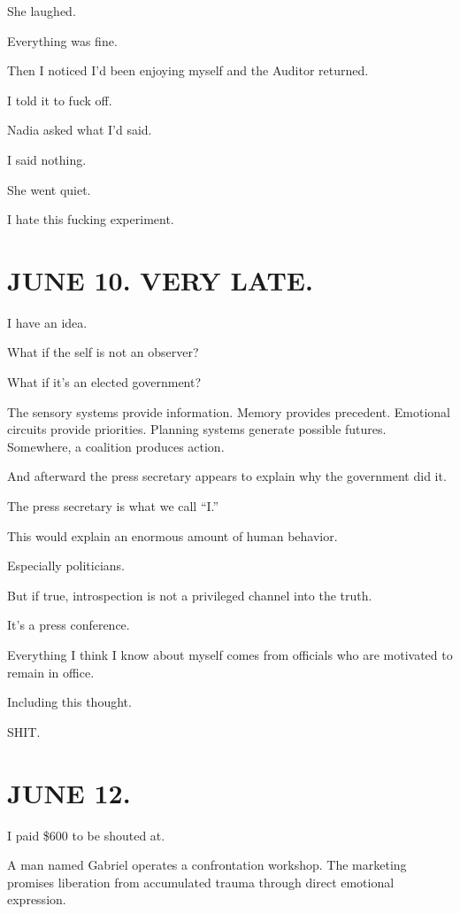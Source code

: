 \documentclass[11pt,oneside]{book}
\begin{document}
She laughed.

Everything was fine.

Then I noticed I'd been enjoying myself and the Auditor returned.

I told it to fuck off.

Nadia asked what I'd said.

I said nothing.

She went quiet.

I hate this fucking experiment.

\section*{JUNE 10. VERY LATE.}

I have an idea.

What if the self is not an observer?

What if it's an elected government?

The sensory systems provide information. Memory provides precedent. Emotional circuits provide priorities. Planning systems generate possible futures. Somewhere, a coalition produces action.

And afterward the press secretary appears to explain why the government did it.

The press secretary is what we call ``I.''

This would explain an enormous amount of human behavior.

Especially politicians.

But if true, introspection is not a privileged channel into the truth.

It's a press conference.

Everything I think I know about myself comes from officials who are motivated to remain in office.

Including this thought.

SHIT.

\section*{JUNE 12.}

I paid \$600 to be shouted at.

A man named Gabriel operates a confrontation workshop. The marketing promises liberation from accumulated trauma through direct emotional expression.
\end{document}
